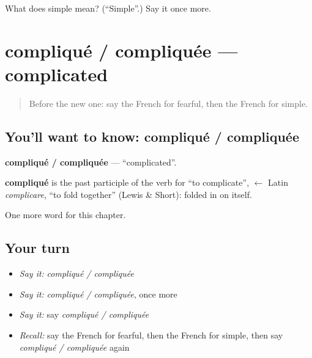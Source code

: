 \begin{tcolorbox}[breakable,colback=teal!4,colframe=teal!35!black,title={Before you move on}]
What does simple mean? (\textquotedblleft{}Simple\textquotedblright{}.) Say it once more.
\end{tcolorbox}
\section[compliqué / compliquée]{compliqué / compliquée — complicated}

\label{lesson:FR-C191-complique-compliquee}



\begin{quote}
Before the new one: say the French for fearful, then the French for simple.
\end{quote}

\subsection*{You'll want to know: compliqué / compliquée}
\textbf{compliqué / compliquée} — \textquotedblleft{}complicated\textquotedblright{}.

\begin{cousinweb}
\textbf{compliqué} is the past participle of the verb for \textquotedblleft{}to complicate\textquotedblright{}, $\leftarrow$ Latin \emph{complicare}, \textquotedblleft{}to fold together\textquotedblright{} (Lewis \& Short): folded in on itself.
\end{cousinweb}

\begin{grammarlens}[title={What you've built}]
One more word for this chapter.
\end{grammarlens}

\subsection*{Your turn}
\begin{itemize}
\raggedright
  \item \emph{Say it:} \emph{compliqué / compliquée}
  \item \emph{Say it:} \emph{compliqué / compliquée}, once more
  \item \emph{Say it:} say \emph{compliqué / compliquée}
  \item \emph{Recall:} say the French for fearful, then the French for simple, then say \emph{compliqué / compliquée} again
\end{itemize}

